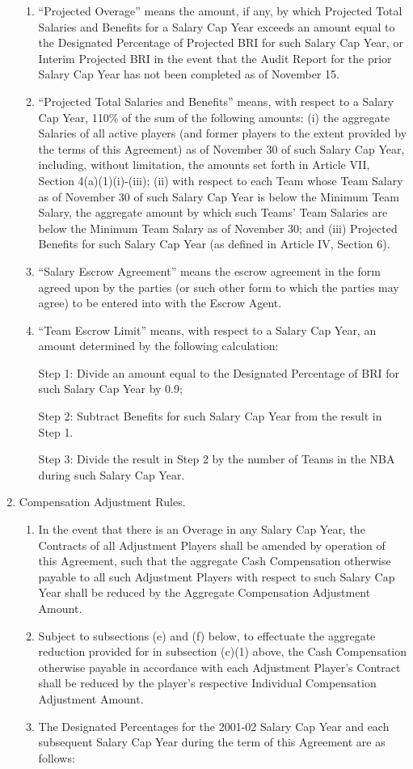 \documentclass[
]{book}
\providecommand{\tightlist}{%
  \setlength{\itemsep}{0pt}\setlength{\parskip}{0pt}}
\begin{document}
\begin{enumerate}
\begin{enumerate}
  \item
    ``Projected Overage'' means the amount, if any, by which Projected Total Salaries and Benefits for a Salary Cap Year exceeds an amount equal to the Designated Percentage of Projected BRI for such Salary Cap Year, or Interim Projected BRI in the event that the Audit Report for the prior Salary Cap Year has not been completed as of November 15.
  \item
    ``Projected Total Salaries and Benefits'' means, with respect to a Salary Cap Year, 110\% of the sum of the following amounts: (i) the aggregate Salaries of all active players (and former players to the extent provided by the terms of this Agreement) as of November 30 of such Salary Cap Year, including, without limitation, the amounts set forth in Article VII, Section 4(a)(1)(i)-(iii); (ii) with respect to each Team whose Team Salary as of November 30 of such Salary Cap Year is below the Minimum Team Salary, the aggregate amount by which such Teams' Team Salaries are below the Minimum Team Salary as of November 30; and (iii) Projected Benefits for such Salary Cap Year (as defined in Article IV, Section 6).
  \item
    ``Salary Escrow Agreement'' means the escrow agreement in the form agreed upon by the parties (or such other form to which the parties may agree) to be entered into with the Escrow Agent.
  \item
    ``Team Escrow Limit'' means, with respect to a Salary Cap Year, an amount determined by the following calculation:

    Step 1: Divide an amount equal to the Designated Percentage of BRI for such Salary Cap Year by 0.9;

    Step 2: Subtract Benefits for such Salary Cap Year from the result in Step 1.

    Step 3: Divide the result in Step 2 by the number of Teams in the NBA during such Salary Cap Year.
  \end{enumerate}
\item
  Compensation Adjustment Rules.

  \begin{enumerate}
  \def\labelenumii{(\arabic{enumii})}
  \tightlist
  \item
    In the event that there is an Overage in any Salary Cap Year, the Contracts of all Adjustment Players shall be amended by operation of this Agreement, such that the aggregate Cash Compensation otherwise payable to all such Adjustment Players with respect to such Salary Cap Year shall be reduced by the Aggregate Compensation Adjustment Amount.
  \item
    Subject to subsections (e) and (f) below, to effectuate the aggregate reduction provided for in subsection (c)(1) above, the Cash Compensation otherwise payable in accordance with each Adjustment Player's Contract shall be reduced by the player's respective Individual Compensation Adjustment Amount.
  \item
    The Designated Percentages for the 2001-02 Salary Cap Year and each subsequent Salary Cap Year during the term of this Agreement are as follows:
  \end{enumerate}


\end{enumerate}
\end{document}
